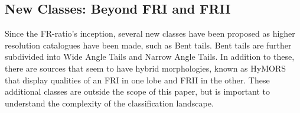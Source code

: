 \documentclass[conference]{IEEEtran}
\begin{document}
\subsection{New Classes: Beyond FRI and FRII}
Since the FR-ratio's inception, several new classes have been proposed as higher resolution catalogues have been made, such as Bent tails. Bent tails are further subdivided into Wide Angle Tails and Narrow Angle Tails. In addition to these, there are sources that seem to have hybrid morphologies, known as HyMORS \cite{gopalkrishna2000} that display qualities of an FRI in one lobe and FRII in the other. These additional classes are outside the scope of this paper, but is important to understand the complexity of the classification landscape.

\end{document}
